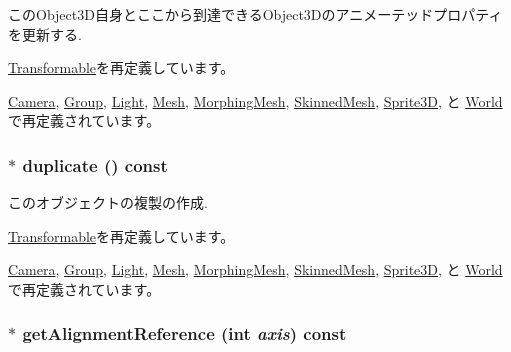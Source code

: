 このObject3D自身とここから到達できるObject3Dのアニメーテッドプロパティを更新する. 

\hyperlink{classm3g_1_1Transformable_8aad1ceab4c2a03609c8a42324ce484d}{Transformable}を再定義しています。

\hyperlink{classm3g_1_1Camera_8aad1ceab4c2a03609c8a42324ce484d}{Camera}, \hyperlink{classm3g_1_1Group_8aad1ceab4c2a03609c8a42324ce484d}{Group}, \hyperlink{classm3g_1_1Light_8aad1ceab4c2a03609c8a42324ce484d}{Light}, \hyperlink{classm3g_1_1Mesh_8aad1ceab4c2a03609c8a42324ce484d}{Mesh}, \hyperlink{classm3g_1_1MorphingMesh_8aad1ceab4c2a03609c8a42324ce484d}{MorphingMesh}, \hyperlink{classm3g_1_1SkinnedMesh_8aad1ceab4c2a03609c8a42324ce484d}{SkinnedMesh}, \hyperlink{classm3g_1_1Sprite3D_8aad1ceab4c2a03609c8a42324ce484d}{Sprite3D}, と \hyperlink{classm3g_1_1World_8aad1ceab4c2a03609c8a42324ce484d}{World}で再定義されています。\hypertarget{classm3g_1_1Node_0b9f7531a4b56d34f47aeb1fff0d37e0}{
\subsubsection[{duplicate}]{ $\ast$ duplicate () const}}
\label{classm3g_1_1Node_0b9f7531a4b56d34f47aeb1fff0d37e0}


このオブジェクトの複製の作成. 

\hyperlink{classm3g_1_1Transformable_4f64f95a34c56cb1553dc6de660dff6f}{Transformable}を再定義しています。

\hyperlink{classm3g_1_1Camera_6279f7f8ab52af683fadd193d7694f2d}{Camera}, \hyperlink{classm3g_1_1Group_1212dbd493e73180a6204874bd97df6b}{Group}, \hyperlink{classm3g_1_1Light_7a41af040d0c1566358d84f089cd0cd1}{Light}, \hyperlink{classm3g_1_1Mesh_52ce6d0b3eda2bd3a95bfb5b7dbb6f82}{Mesh}, \hyperlink{classm3g_1_1MorphingMesh_7e7b2c3c4c988c6341a5e249bd468f57}{MorphingMesh}, \hyperlink{classm3g_1_1SkinnedMesh_d3f422cf7656b73687d789094c7eae42}{SkinnedMesh}, \hyperlink{classm3g_1_1Sprite3D_0af34e87be803eb476f9e118d2363246}{Sprite3D}, と \hyperlink{classm3g_1_1World_efde97aaf753d48fff769d9011f187f2}{World}で再定義されています。\hypertarget{classm3g_1_1Node_ca338390bd2dee287fe6f5cbc4e094e1}{
\subsubsection[{getAlignmentReference}]{ $\ast$ getAlignmentReference (int {\em axis}) const}}
\label{classm3g_1_1Node_ca338390bd2dee287fe6f5cbc4e094e1}



